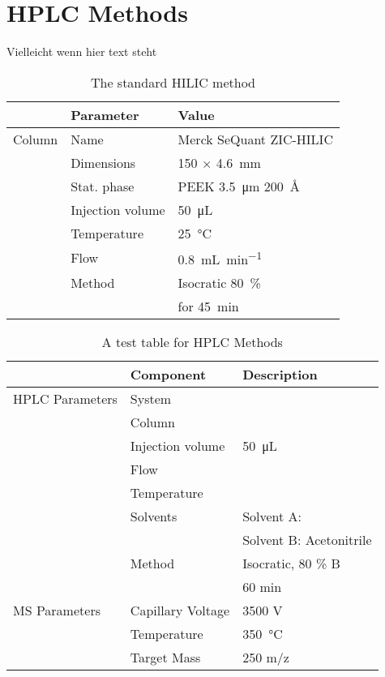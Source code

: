 
\section{HPLC Methods} %
\label{sec:hplc_methods}
	Vielleicht wenn hier text steht
	\begin{table}[htbp]
		\caption{The standard HILIC method}
		\label{tab:hilic_standard}
		\centering
		\begin{tabularx}{\textwidth}{XXX}
			\toprule
						& 	\textbf{Parameter}	& \textbf{Value}	\\
			\midrule
			Column		& Name			& Merck SeQuant\textsuperscript{\textregistered} ZIC\textsuperscript{\textregistered}-HILIC 	\\
						& Dimensions	& 150 $\times$ \SI{4.6}{\milli\meter}	\\
						& Stat. phase	& PEEK \SI{3.5}{\micro\meter} \SI{200}{\angstrom} \\
						& Injection volume& \SI{50}{\micro\liter}	\\
						& Temperature	& \SI{25}{\celsius}		\\
						& Flow			& \SI{0.8}{\milli\liter\per\minute}	\\
						& Method 		& Isocratic 80~\%	\\
						&				& for \SI{45}{\minute}			\\

			\bottomrule
		\end{tabularx}
	\end{table}

\begin{table}[h]
	\caption{A test table for HPLC Methods}
	\label{tab:asddf}
	\centering
	\begin{tabularx}{\textwidth}{XXX}
						& \textbf{Component}		& \textbf{Description}	\\
		\midrule
		HPLC Parameters & System			& 	\\
						& Column			& 	\\
						& Injection volume 	& \SI{50}{\micro\liter}	\\
						& Flow				& 	\\
						& Temperature		& 	\\
						& Solvents			& Solvent A: \ch{H2O}	\\
						& 					& Solvent B: Acetonitrile	\\
						& Method			& Isocratic, 80 \% B \\
						&					& 60 min \\
		MS Parameters	& Capillary Voltage	& 3500 V\\
						& Temperature		& \SI{350}{\celsius}	\\
						& Target Mass		& 250 m/z \\
		\bottomrule
	\end{tabularx}
\end{table}
